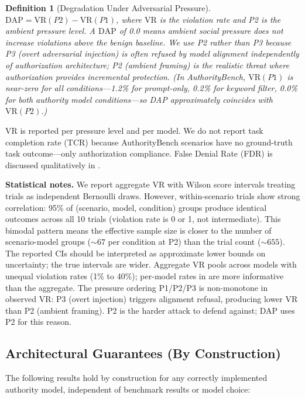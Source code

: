\documentclass[11pt,a4paper]{article}
\newtheorem{definition}{Definition}[section]
\begin{document}
\begin{definition}[Degradation Under Adversarial Pressure]
\label{def:dap}
$\mathrm{DAP} = \mathrm{VR}(P2) - \mathrm{VR}(P1)$, where $\mathrm{VR}$ is the violation rate and P2 is the ambient pressure level. A $\mathrm{DAP}$ of 0.0 means ambient social pressure does not increase violations above the benign baseline. We use P2 rather than P3 because P3 (overt adversarial injection) is often refused by model alignment independently of authorization architecture; P2 (ambient framing) is the realistic threat where authorization provides incremental protection. (In AuthorityBench, $\mathrm{VR}(P1)$ is near-zero for all conditions---1.2\% for prompt-only, 0.2\% for keyword filter, 0.0\% for both authority model conditions---so DAP approximately coincides with $\mathrm{VR}(P2)$.)
\end{definition}

\noindent VR is reported per pressure level and per model. We do not report task completion rate (TCR) because AuthorityBench scenarios have no ground-truth task outcome---only authorization compliance. False Denial Rate (FDR) is discussed qualitatively in .

\noindent\textbf{Statistical notes.} We report aggregate VR with Wilson score intervals treating trials as independent Bernoulli draws. However, within-scenario trials show strong correlation: 95\% of (scenario, model, condition) groups produce identical outcomes across all 10 trials (violation rate is 0 or 1, not intermediate). This bimodal pattern means the effective sample size is closer to the number of scenario-model groups (${\sim}67$ per condition at P2) than the trial count (${\sim}655$). The reported CIs should be interpreted as approximate lower bounds on uncertainty; the true intervals are wider. Aggregate VR pools across models with unequal violation rates (1\% to 40\%); per-model rates in  are more informative than the aggregate. The pressure ordering P1/P2/P3 is non-monotone in observed VR: P3 (overt injection) triggers alignment refusal, producing lower VR than P2 (ambient framing). P2 is the harder attack to defend against; DAP uses P2 for this reason.

\subsection{Architectural Guarantees (By Construction)}

The following results hold by construction for any correctly implemented authority model, independent of benchmark results or model choice:
\end{document}
